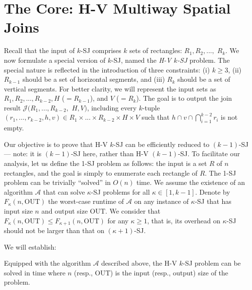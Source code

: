 \documentclass[sigconf]{acmart}
\def\vgap{\vspace{1mm}}
\def\A{\mathcal{A}}
\def\J{\mathcal{J}}
\def\out{\mathrm{OUT}}
\begin{document}
\section{The Core: H-V Multiway Spatial Joins} \label{sec:hv}

Recall that the input of $k$-SJ comprises $k$ sets of rectangles: $R_1, R_2, ...,$ $R_k$. We now formulate a special version of $k$-SJ, named the {\em H-V $k$-SJ} problem. The special nature is reflected in the introduction of three constraints: (i) $k \ge 3$, (ii) $R_{k-1}$ should be a set of horizontal segments, and (iii) $R_k$ should be a set of vertical segments. For better clarity, we will represent the input sets as $R_1, R_2, ..., R_{k-2}, H$ ($=R_{k-1}$), and $V$ ($=R_k$). The goal is to output the join result $\J(R_1, ..., R_{k-2},$ $H, V)$, including every $k$-tuple $(r_1, ..., r_{k-2}, h, v) \in R_1 \times ... \times R_{k-2} \times H \times V$ such that $h \cap v \cap \bigcap_{i=1}^{k-2} r_i$ is not empty. 


\vgap

Our objective is to prove that H-V $k$-SJ can be efficiently reduced to $(k-1)$-SJ --- note: it is $(k-1)$-SJ here, rather than H-V $(k-1)$-SJ. To facilitate our analysis, let us define the 1-SJ problem as follows: the input is a set $R$ of $n$ rectangles, and the goal is simply to enumerate each rectangle of $R$. The 1-SJ problem can be trivially ``solved'' in $O(n)$ time. We assume the existence of an algorithm $\A$ that can solve $\kappa$-SJ problems for all $\kappa \in [1, k-1]$. Denote by $F_\kappa(n, \out)$ the worst-case runtime of $\A$ on any instance of $\kappa$-SJ that has input size $n$ and output size $\out$. We consider that $F_\kappa(n, \out) \le F_{\kappa + 1}(n, \out)$ for any $\kappa \ge 1$, that is, its overhead on $\kappa$-SJ should not be larger than that on $(\kappa+1)$-SJ.

\vgap

We will establish:

\begin{lemma} \label{lmm:hv}
    Equipped with the algorithm $\A$ described above, the H-V $k$-SJ problem can be solved in time
    \myeqn{
        O(k) \cdot \big( F_{k-1}(n, \out) + n\log n + k \cdot \out \big) \nn
    }
    where $n$ (resp., $\out$) is the input (resp., output) size of the problem.
\end{lemma}
\end{document}
